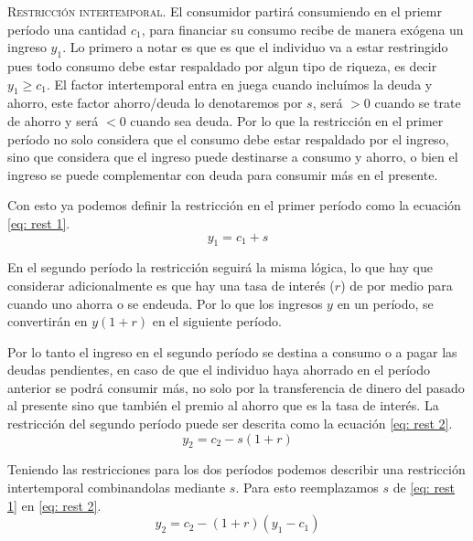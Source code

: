 \textsc{Restricción intertemporal}. El consumidor partirá consumiendo en el priemr período una cantidad $c_1$, para financiar su consumo recibe de manera exógena un ingreso $y_1$. Lo primero a notar es que es que el individuo va a estar restringido pues todo consumo debe estar respaldado por algun tipo de riqueza, es decir $y_1 \geq c_1$. El factor intertemporal entra en juega cuando incluímos la deuda y ahorro, este factor ahorro/deuda lo denotaremos por $s$, será $>0$ cuando se trate de ahorro y será $<0$ cuando sea deuda. Por lo que la restricción en el primer período no solo considera que el consumo debe estar respaldado por el ingreso, sino que considera que el ingreso puede destinarse a consumo y ahorro, o bien el ingreso se puede complementar con deuda para consumir más en el presente.

Con esto ya podemos definir la restricción en el primer período como la ecuación \ref{eq: rest 1}.
\begin{equation}
    y_1 = c_1+s \label{eq: rest 1}
\end{equation}

En el segundo período la restricción seguirá la misma lógica, lo que hay que considerar adicionalmente es que hay una tasa de interés ($r$) de por medio para cuando uno ahorra o se endeuda. Por lo que los ingresos $y$ en un período, se convertirán en $y(1+r)$ en el siguiente período.

Por lo tanto el ingreso en el segundo período se destina a consumo o a pagar las deudas pendientes, en caso de que el individuo haya ahorrado en el período anterior se podrá consumir más, no solo por la transferencia de dinero del pasado al presente sino que también el premio al ahorro que es la tasa de interés. La restricción del segundo período puede ser descrita como la ecuación \ref{eq: rest 2}.
\begin{equation}
    y_2 = c_2 - s(1+r) \label{eq: rest 2}
\end{equation}

Teniendo las restricciones para los dos períodos podemos describir una restricción intertemporal combinandolas mediante $s$. Para esto reemplazamos $s$ de \ref{eq: rest 1} en \ref{eq: rest 2}.
\begin{equation*}
    y_2 = c_2 - (1+r)(y_1-c_1) 
\end{equation*}

